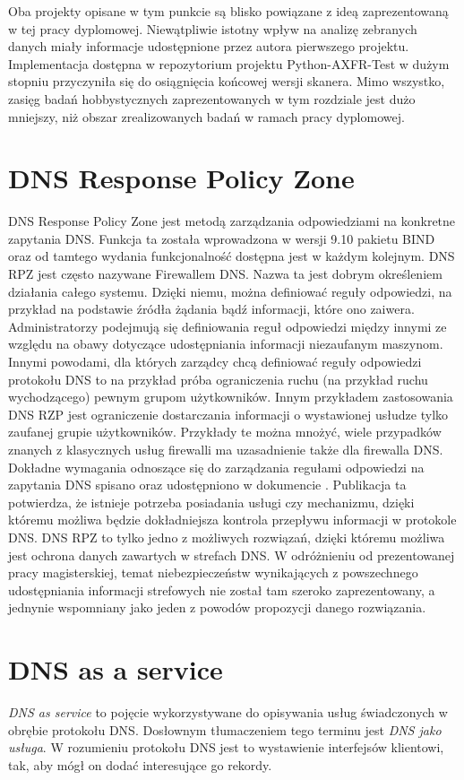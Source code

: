Oba projekty opisane w tym punkcie są blisko powiązane z ideą zaprezentowaną w tej pracy dyplomowej. Niewątpliwie istotny wpływ
na analizę zebranych danych miały informacje udostępnione przez autora pierwszego projektu. Implementacja dostępna w repozytorium
projektu Python-AXFR-Test \cite{python_axfr_test} w dużym stopniu przyczyniła się do osiągnięcia końcowej wersji skanera. Mimo
wszystko, zasięg badań hobbystycznych zaprezentowanych w tym rozdziale jest dużo mniejszy, niż obszar zrealizowanych badań w ramach
pracy dyplomowej.

\section{DNS Response Policy Zone}
DNS Response Policy Zone jest metodą zarządzania odpowiedziami na konkretne zapytania DNS. Funkcja ta została wprowadzona w wersji
9.10 pakietu BIND oraz od tamtego wydania funkcjonalność dostępna jest w każdym kolejnym. DNS RPZ jest często nazywane Firewallem DNS.
Nazwa ta jest dobrym określeniem działania całego systemu. Dzięki niemu, można definiować reguły odpowiedzi, na przykład na podstawie
źródła żądania bądź informacji, które ono zaiwera. Administratorzy podejmują się definiowania reguł odpowiedzi między innymi
ze względu na obawy dotyczące udostępniania
informacji niezaufanym maszynom. Innymi powodami, dla których zarządcy chcą definiować reguły odpowiedzi protokołu DNS to na przykład
próba ograniczenia ruchu (na przykład ruchu wychodzącego) pewnym grupom użytkowników. Innym przykładem zastosowania DNS RZP
jest ograniczenie dostarczania informacji o wystawionej usłudze tylko zaufanej grupie użytkowników. Przykłady te można mnożyć,
wiele przypadków znanych z klasycznych usług firewalli ma uzasadnienie także dla firewalla DNS. Dokładne wymagania odnoszące się do
zarządzania regułami odpowiedzi na zapytania DNS spisano oraz udostępniono w dokumencie \cite{I-D.ietf-dnsop-dns-rpz}. Publikacja ta
potwierdza, że istnieje potrzeba posiadania usługi czy mechanizmu, dzięki któremu możliwa będzie dokładniejsza kontrola przepływu
informacji w protokole DNS. DNS RPZ to tylko jedno z możliwych rozwiązań, dzięki któremu
możliwa jest ochrona danych zawartych w strefach DNS. W odróżnieniu od prezentowanej pracy magisterskiej, temat niebezpieczeństw
wynikających z powszechnego udostępniania informacji
strefowych nie został tam szeroko zaprezentowany, a jednynie wspomniany jako jeden z powodów propozycji danego rozwiązania.

\section{DNS as a service}
\textit{DNS as service} to pojęcie wykorzystywane do opisywania usług świadczonych w obrębie protokołu DNS. Dosłownym tłumaczeniem tego
terminu jest \textit{DNS jako usługa}. W rozumieniu protokołu DNS jest to wystawienie interfejsów klientowi, tak,
aby mógł on dodać interesujące go rekordy.

